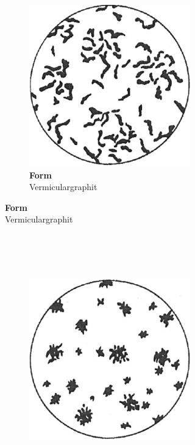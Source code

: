 \documentclass[
fontsize=10pt, 
listof = totoc,
parskip = half	
]{report}
\newcommand{\uproman}[1]{\uppercase\expandafter{\romannumeral#1}}
\begin{document}
\begin{figure}[h]
\begin{subfigure}{1.0\textwidth}
\begin{subfigure}{0.33\textwidth}
		\end{subfigure}\hfill
		\begin{subfigure}{0.33\textwidth}
			\centering
			\includegraphics[scale=0.25]{pics/graphit_form3}
			\caption*{\textbf{Form \uproman{3}}\\Vermiculargraphit}
		\end{subfigure}
	\end{subfigure}
	\\\\\\
	\begin{subfigure}{1.0\linewidth}
		\begin{subfigure}[t]{0.33\textwidth}
			\centering
			\includegraphics[scale=0.25]{pics/graphit_form4}

\end{subfigure}
\end{subfigure}
\end{figure}
\end{document}
